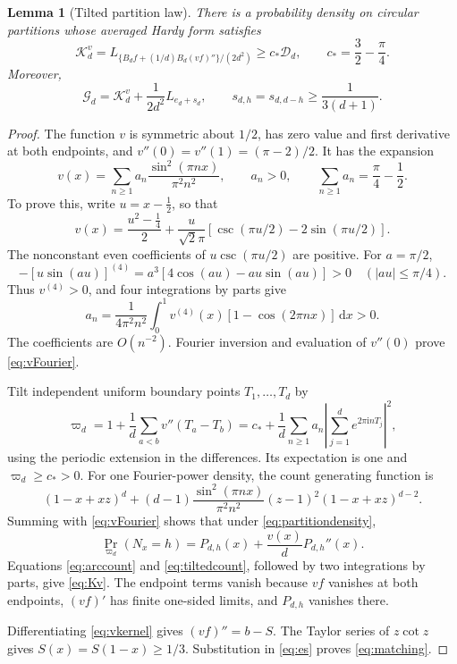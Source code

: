 \documentclass[11pt]{amsart}
\newtheorem{lemma}[theorem]{Lemma}
\theoremstyle{remark}
\theoremstyle{plain}
\numberwithin{equation}{section}
\newcommand{\ii}{\mathrm i}
\newcommand{\dd}{\,\mathrm d}
\newcommand{\Gdef}{\mathcal G_d}
\newcommand{\Ddef}{\mathcal D_d}
\newcommand{\cstar}{c_*}
\begin{document}
\begin{lemma}[Tilted partition law]\label{lem:tilted}
There is a probability density on circular partitions whose averaged
Hardy form satisfies
\begin{equation}\label{eq:Kv}
 \mathcal K_d^v
 =L_{\{B_df+(1/d)B_d(vf)''\}/(2d^2)}
 \ge\cstar\Ddef,\qquad \cstar=\frac32-\frac\pi4.
\end{equation}
Moreover,
\begin{equation}\label{eq:matching}
 \Gdef=\mathcal K_d^v+\frac1{2d^2}L_{e_d+s_d},
 \qquad s_{d,h}=s_{d,d-h}\ge\frac1{3(d+1)}.
\end{equation}
\end{lemma}

\begin{proof}
The function \(v\) is symmetric about \(1/2\), has zero value and
first derivative at both endpoints, and
\(v''(0)=v''(1)=(\pi-2)/2\).
It has the expansion
\begin{equation}\label{eq:vFourier}
 v(x)=\sum_{n\ge1}a_n\frac{\sin^2(\pi nx)}{\pi^2n^2},
 \qquad a_n>0,\qquad
 \sum_{n\ge1}a_n=\frac\pi4-\frac12.
\end{equation}
To prove this, write \(u=x-\tfrac12\), so that
\[
 v(x)=\frac{u^2-\tfrac14}{2}
 +\frac{u}{\sqrt2\pi}
 \left[\csc(\pi u/2)-2\sin(\pi u/2)\right].
\]
The nonconstant even coefficients of \(u\csc(\pi u/2)\) are positive.
For \(a=\pi/2\),
\[
 -[u\sin(au)]^{(4)}
 =a^3[4\cos(au)-au\sin(au)]>0
 \quad(|au|\le\pi/4).
\]
Thus \(v^{(4)}>0\), and four integrations by parts give
\[
 a_n=\frac1{4\pi^2n^2}
 \int_0^1v^{(4)}(x)[1-\cos(2\pi nx)]\dd x>0.
\]
The coefficients are \(O(n^{-2})\).
Fourier inversion and evaluation of \(v''(0)\) prove
\eqref{eq:vFourier}.

Tilt independent uniform boundary points \(T_1,\ldots,T_d\) by
\begin{equation}\label{eq:partitiondensity}
 \varpi_d=1+\frac1d\sum_{a<b}v''(T_a-T_b)
 =\cstar+\frac1d\sum_{n\ge1}a_n
       \left|\sum_{j=1}^de^{2\pi\ii nT_j}\right|^2,
\end{equation}
using the periodic extension in the differences.
Its expectation is one and \(\varpi_d\ge\cstar>0\).
For one Fourier-power density, the count generating function is
\[
 (1-x+xz)^d+
 (d-1)\frac{\sin^2(\pi nx)}{\pi^2n^2}
       (z-1)^2(1-x+xz)^{d-2}.
\]
Summing with \eqref{eq:vFourier} shows that under
\eqref{eq:partitiondensity},
\begin{equation}\label{eq:tiltedcount}
 \Pr_{\varpi_d}(N_x=h)=
 P_{d,h}(x)+\frac{v(x)}dP_{d,h}''(x).
\end{equation}
Equations \eqref{eq:arccount} and \eqref{eq:tiltedcount}, followed by
two integrations by parts, give \eqref{eq:Kv}.
The endpoint terms vanish because \(vf\) vanishes at both endpoints,
\((vf)'\) has finite one-sided limits, and \(P_{d,h}\) vanishes there.

Differentiating \eqref{eq:vkernel} gives \((vf)''=b-S\).
The Taylor series of \(z\cot z\) gives
\(S(x)=S(1-x)\ge1/3\). Substitution in \eqref{eq:es} proves
\eqref{eq:matching}.
\end{proof}
\end{document}
